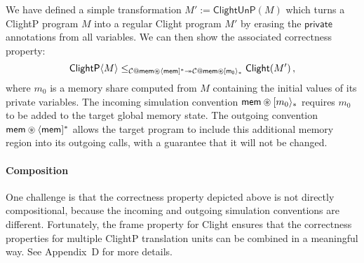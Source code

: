 \documentclass[acmsmall,screen,review,anonymous,nonacm]{acmart}
\newcommand{\kw}[1]{\ensuremath{ \mathsf{#1} }}
\newcommand{\sepconj}{\oast}
\begin{document}
We have defined a simple transformation $M' := \kw{ClightUnP}(M)$
which turns a ClightP program $M$ into a regular Clight program $M'$
by erasing the $\kw{private}$ annotations from all variables.
We can then show the associated correctness property:
\[
  \kw{ClightP}\langle M \rangle \le_{
    \mathcal{C} \mathbin@ \kw{mem} \sepconj \langle \kw{mem} ]^*
    \twoheadrightarrow
    \mathcal{C} \mathbin@ \kw{mem} \sepconj [ \kw{m_0} \rangle_*}
  \kw{Clight}(M')
  \,,
\]
where $m_0$ is a memory share computed from $M$
containing the initial values of its private variables.
The incoming simulation convention $\kw{mem} \sepconj [m_0\rangle_*$
requires $m_0$ to be added to the target global memory state.
The outgoing convention $\kw{mem} \sepconj \langle \kw{mem} ]^*$
allows the target program to include this additional memory region
into its outgoing calls,
with a guarantee that it will not be changed.



\paragraph{Composition}

One challenge is that the correctness property depicted above
is not directly compositional,
because the incoming and outgoing simulation conventions are different.
Fortunately,
the frame property for Clight ensures that
the correctness properties for multiple ClightP translation units
can be combined in a meaningful way.
See Appendix~D for more details. %

\end{document}

